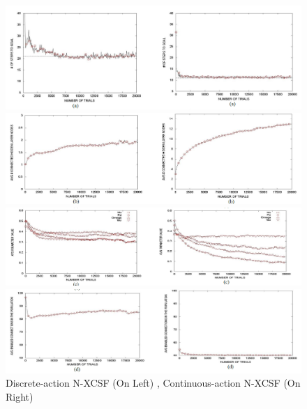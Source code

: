 \documentclass[12pt]{article}
\begin{document}
\begin{figure}
\begin{center}
\includegraphics[width=6in]{3a.png}
\end{center}
\begin{center}
\includegraphics[width=6in]{3b.png}
\end{center}
\begin{center}
\includegraphics[width=6in]{3c.png}
\end{center}
\begin{center}
\includegraphics[width=6in]{3d.png}
\end{center}
\caption{Discrete-action N-XCSF (On Left) , Continuous-action N-XCSF (On Right) \label{fig:first}}
\end{figure}
\end{document}

